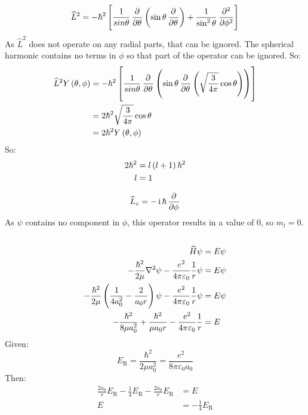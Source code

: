 \subsection{}
\begin{equation*}
    \widehat{L}^2 = - \hbar^2 \sbr{\frac{1}{sin{\theta}} \dpd{}{\theta} \del{\sin{\theta} \dpd{}{\theta}} + \frac{1}{\sin^2{\theta}} \dpd[2]{}{\phi}}
\end{equation*}
As $ \widehat{L}^2 $ does not operate on any radial parts, that can be ignored. The spherical harmonic contains no terms in $ \phi $ so that part of the operator can be ignored. So:
\begin{align*}
    \widehat{L}^2 Y \del{\theta, \phi} & = - \hbar^2 \sbr{\frac{1}{sin{\theta}} \dpd{}{\theta} \del{\sin{\theta} \dpd{}{\theta} \del{\sqrt{\frac{3}{4 \pi}} \cos{\theta}}}}\\
    & = 2 \hbar^2 \sqrt{\frac{3}{4 \pi}} \cos{\theta}\\
    & = 2 \hbar^2 Y \del{\theta, \phi}
\end{align*}
So:
\begin{align*}
    2 \hbar^2 & = l \del{l + 1} \hbar^2\\
    l & = 1
\end{align*}

\begin{equation*}
    \widehat{L}_z = - \operatorname{i} \hbar \dpd{}{\phi}
\end{equation*}
As $ \psi $ contains no component in $ \phi $, this operator results in a value of $ 0 $, so $ m_l = 0 $.

\subsection{}
\begin{align*}
    \widehat{H}\psi & = E \psi\\
    -\frac{\hbar^2}{2 \mu}\laplacian \psi - \frac{e^2}{4 \pi \varepsilon_0} \frac{1}{r} \psi & = E \psi\\
    -\frac{\hbar^2}{2 \mu} \del{\frac{1}{4 a_0^2} - \frac{2}{a_0 r}} \psi - \frac{e^2}{4 \pi \varepsilon_0} \frac{1}{r} \psi & = E \psi\\
    - \frac{\hbar^2}{8 \mu a_0^2} + \frac{\hbar^2}{\mu a_0 r} - \frac{e^2}{4 \pi \varepsilon_0} \frac{1}{r} & = E
\end{align*}
Given:
\begin{equation*}
    E_{\textrm{R}} = \frac{\hbar^2}{2 \mu a_0^2} = \frac{e^2}{8 \pi \varepsilon_0 a_0}
\end{equation*}
Then:
\begin{align*}
    \frac{2 a_0}{r} E_{\textrm{R}} - \frac{1}{4} E_{\textrm{R}} - \frac{2 a_0}{r} E_{\textrm{R}} & = E\\
    E & = - \frac{1}{4} E_{\textrm{R}}
\end{align*}

